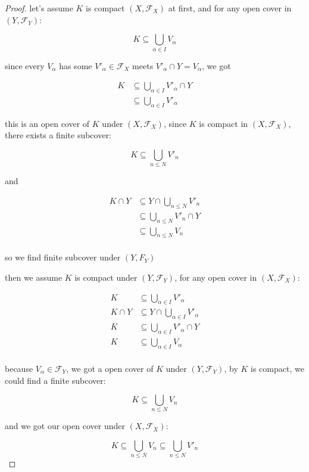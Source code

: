 \begin{proof}
    let's assume $K$ is compact $(X, \mathscr{F}_X)$ at first, and for any open cover in $(Y, \mathscr{F}_Y)$:

    \[
        K \subseteq \bigcup_{\alpha \in I} V_{\alpha}
    \]

    since every $V_{\alpha}$ has some $V'_{\alpha} \in \mathscr{F}_X$ meets $V'_{\alpha} \cap Y = V_{\alpha}$, we got

    \begin{align*}
        K &\subseteq \bigcup_{\alpha \in I} V'_{\alpha} \cap Y \\ & \subseteq \bigcup_{\alpha \in I} V'_{\alpha} 
    \end{align*}

    this is an open cover of $K$ under $(X, \mathscr{F}_X)$, since $K$ is compact in $(X, \mathscr{F}_X)$, there exists 
    a finite subcover:

    \[
        K \subseteq \bigcup_{n \le N} V'_n
    \]

    and

    \begin{align*}
        K \cap Y &\subseteq Y \cap \bigcup_{n \le N} V'_n \\
        &\subseteq \bigcup_{n \le N} V'_n \cap Y \\
        &\subseteq \bigcup_{n \le N} V_n  \\
    \end{align*}

    so we find finite subcover under $(Y, F_{Y})$

    then we assume $K$ is compact under $(Y, \mathscr{F}_Y)$, for any open cover in $(X,\mathscr{F}_X)$:

    \begin{align*}
        K &\subseteq \bigcup_{\alpha \in I} V'_{\alpha} \\
        K \cap Y &\subseteq Y \cap \bigcup_{\alpha \in I} V'_{\alpha} \\
        K  &\subseteq \bigcup_{\alpha \in I} V'_{\alpha} \cap Y \\
        K  &\subseteq \bigcup_{\alpha \in I} V_{\alpha}  \\
    \end{align*}

    because $V_{\alpha} \in \mathscr{F}_Y$, we got a open cover of $K$ under $(Y, \mathscr{F}_Y)$, by
    $K$ is compact, we could find a finite subcover:

    \[
        K \subseteq \bigcup_{n \le N} V_n
    \]

    and we got our open cover under $(X, \mathscr{F}_X)$:


    \[
        K \subseteq \bigcup_{n \le N} V_n  \subseteq \bigcup_{n \le N} V'_n
    \]
\end{proof}

